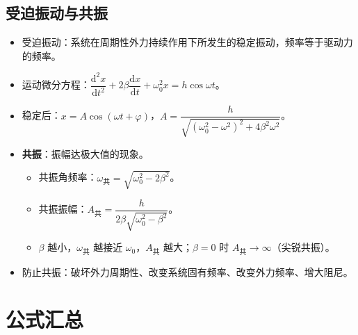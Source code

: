 \documentclass[12pt,a4paper]{ctexart}
\begin{document}
\subsection{受迫振动与共振}

\begin{itemize}
    \item 受迫振动：系统在周期性外力持续作用下所发生的稳定振动，频率等于驱动力的频率。
    \item 运动微分方程：$\dfrac{\mathrm{d}^2x}{\mathrm{d}t^2}+2\beta\dfrac{\mathrm{d}x}{\mathrm{d}t}+\omega_0^2 x=h\cos\omega t$。
    \item 稳定后：$x=A\cos(\omega t+\varphi)$，$A=\dfrac{h}{\sqrt{(\omega_0^2-\omega^2)^2+4\beta^2\omega^2}}$。
    \item \textbf{共振}：振幅达极大值的现象。
    \begin{itemize}
        \item 共振角频率：$\omega_{\text{共}}=\sqrt{\omega_0^2-2\beta^2}$。
        \item 共振振幅：$A_{\text{共}}=\dfrac{h}{2\beta\sqrt{\omega_0^2-\beta^2}}$。
        \item $\beta$ 越小，$\omega_{\text{共}}$ 越接近 $\omega_0$，$A_{\text{共}}$ 越大；$\beta=0$ 时 $A_{\text{共}}\to\infty$（尖锐共振）。
    \end{itemize}
    \item 防止共振：破坏外力周期性、改变系统固有频率、改变外力频率、增大阻尼。
\end{itemize}

\section{公式汇总}
\end{document}
